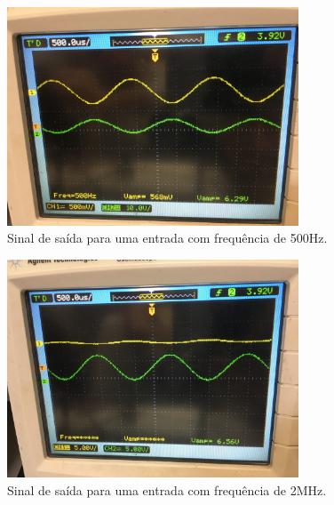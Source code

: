     \begin{figure}[h!]
        \centering
        \includegraphics[height=6.5cm]{imgSource/oscilloscope/foto8.jpg}
        \caption{Sinal de saída para uma entrada com frequência de 500Hz.}
        \label{fig:foto9}
    \end{figure}

    \begin{figure}[h!]
        \centering
        \includegraphics[height=6.5cm]{imgSource/oscilloscope/foto9.jpg}
        \caption{Sinal de saída para uma entrada com frequência de 2MHz.}
        \label{fig:foto10}
    \end{figure}

